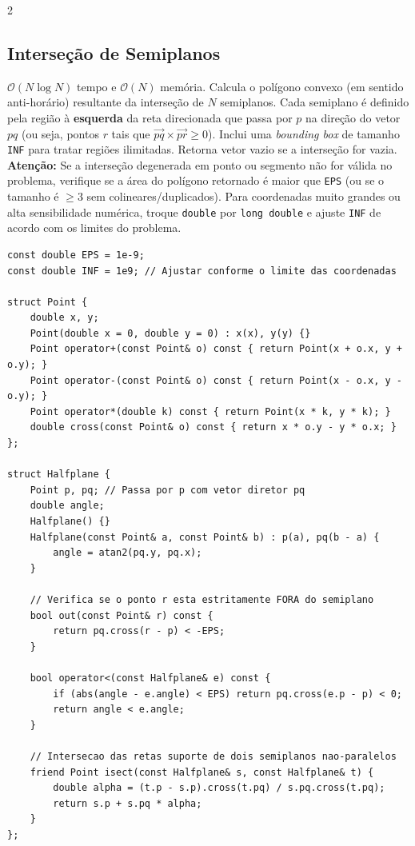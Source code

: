 \documentclass[11pt]{article}
\begin{document}
\begin{multicols}{2}
\subsection{Interseção de Semiplanos}
$\mathcal{O}(N \log N)$ tempo e $\mathcal{O}(N)$ memória. Calcula o polígono convexo (em sentido anti-horário) resultante da interseção de $N$ semiplanos. Cada semiplano é definido pela região à \textbf{esquerda} da reta direcionada que passa por $p$ na direção do vetor $pq$ (ou seja, pontos $r$ tais que $\overrightarrow{pq} \times \overrightarrow{pr} \ge 0$). Inclui uma \textit{bounding box} de tamanho \texttt{INF} para tratar regiões ilimitadas. Retorna vetor vazio se a interseção for vazia. \textbf{Atenção:} Se a interseção degenerada em ponto ou segmento não for válida no problema, verifique se a área do polígono retornado é maior que \texttt{EPS} (ou se o tamanho é $\ge 3$ sem colineares/duplicados). Para coordenadas muito grandes ou alta sensibilidade numérica, troque \texttt{double} por \texttt{long double} e ajuste \texttt{INF} de acordo com os limites do problema.
\begin{lstlisting}
const double EPS = 1e-9;
const double INF = 1e9; // Ajustar conforme o limite das coordenadas

struct Point {
    double x, y;
    Point(double x = 0, double y = 0) : x(x), y(y) {}
    Point operator+(const Point& o) const { return Point(x + o.x, y + o.y); }
    Point operator-(const Point& o) const { return Point(x - o.x, y - o.y); }
    Point operator*(double k) const { return Point(x * k, y * k); }
    double cross(const Point& o) const { return x * o.y - y * o.x; }
};

struct Halfplane {
    Point p, pq; // Passa por p com vetor diretor pq
    double angle;
    Halfplane() {}
    Halfplane(const Point& a, const Point& b) : p(a), pq(b - a) {
        angle = atan2(pq.y, pq.x);
    }

    // Verifica se o ponto r esta estritamente FORA do semiplano
    bool out(const Point& r) const {
        return pq.cross(r - p) < -EPS;
    }

    bool operator<(const Halfplane& e) const {
        if (abs(angle - e.angle) < EPS) return pq.cross(e.p - p) < 0;
        return angle < e.angle;
    }

    // Intersecao das retas suporte de dois semiplanos nao-paralelos
    friend Point isect(const Halfplane& s, const Halfplane& t) {
        double alpha = (t.p - s.p).cross(t.pq) / s.pq.cross(t.pq);
        return s.p + s.pq * alpha;
    }
};


\end{lstlisting}
\end{multicols}
\end{document}
